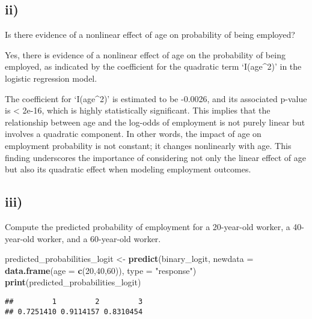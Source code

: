 \documentclass[
]{article}
\newenvironment{Shaded}{\begin{snugshade}}{\end{snugshade}}
\newcommand{\AttributeTok}[1]{\textcolor[rgb]{0.13,0.29,0.53}{#1}}
\newcommand{\DecValTok}[1]{\textcolor[rgb]{0.00,0.00,0.81}{#1}}
\newcommand{\FunctionTok}[1]{\textcolor[rgb]{0.13,0.29,0.53}{\textbf{#1}}}
\newcommand{\NormalTok}[1]{#1}
\newcommand{\OtherTok}[1]{\textcolor[rgb]{0.56,0.35,0.01}{#1}}
\newcommand{\StringTok}[1]{\textcolor[rgb]{0.31,0.60,0.02}{#1}}
\begin{document}
\hypertarget{ii-2}{%
\subsection{ii)}\label{ii-2}}

Is there evidence of a nonlinear effect of age on probability of being
employed? \vspace{1em}

Yes, there is evidence of a nonlinear effect of age on the probability
of being employed, as indicated by the coefficient for the quadratic
term `I(age\^{}2)' in the logistic regression model.

The coefficient for `I(age\^{}2)' is estimated to be -0.0026, and its
associated p-value is \textless{} 2e-16, which is highly statistically
significant. This implies that the relationship between age and the
log-odds of employment is not purely linear but involves a quadratic
component. In other words, the impact of age on employment probability
is not constant; it changes nonlinearly with age. This finding
underscores the importance of considering not only the linear effect of
age but also its quadratic effect when modeling employment outcomes.

\hypertarget{iii-2}{%
\subsection{iii)}\label{iii-2}}

Compute the predicted probability of employment for a 20-year-old
worker, a 40-year-old worker, and a 60-year-old worker.

\begin{Shaded}
\begin{Highlighting}[]
\NormalTok{predicted\_probabilities\_logit }\OtherTok{\textless{}{-}} \FunctionTok{predict}\NormalTok{(binary\_logit, }
                                         \AttributeTok{newdata =} \FunctionTok{data.frame}\NormalTok{(}\AttributeTok{age =} \FunctionTok{c}\NormalTok{(}\DecValTok{20}\NormalTok{,}\DecValTok{40}\NormalTok{,}\DecValTok{60}\NormalTok{)), }
                                         \AttributeTok{type =} \StringTok{"response"}\NormalTok{)}
\FunctionTok{print}\NormalTok{(predicted\_probabilities\_logit)}
\end{Highlighting}
\end{Shaded}

\begin{verbatim}
##         1         2         3 
## 0.7251410 0.9114157 0.8310454
\end{verbatim}
\end{document}
